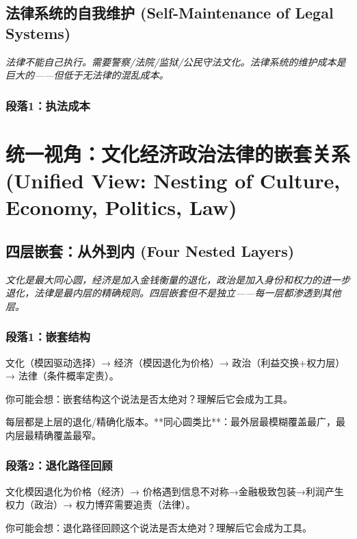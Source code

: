 \documentclass[a4paper,12pt]{book}
\newenvironment{motivation}{\begin{tcolorbox}[colback=gray!10,colframe=gray!60,title=\textit{动机}]\small\itshape}{\end{tcolorbox}}
\begin{document}
\begin{motivation}
\begin{motivation}
	\subsection{法律系统的自我维护 (Self-Maintenance of Legal Systems)}
	\begin{motivation}法律不能自己执行。需要警察/法院/监狱/公民守法文化。法律系统的维护成本是巨大的——但低于无法律的混乱成本。\end{motivation}
	\subsubsection*{段落1：执法成本}


	\section{统一视角：文化经济政治法律的嵌套关系 (Unified View: Nesting of Culture, Economy, Politics, Law)}

	\subsection{四层嵌套：从外到内 (Four Nested Layers)}
	\begin{motivation}
		文化是最大同心圆，经济是加入金钱衡量的退化，政治是加入身份和权力的进一步退化，法律是最内层的精确规则。四层嵌套但不是独立——每一层都渗透到其他层。
	\end{motivation}

	\subsubsection*{段落1：嵌套结构}
	文化（模因驱动选择）→ 经济（模因退化为价格）→ 政治（利益交换+权力层）→ 法律（条件概率定责）。
	\begin{tcolorbox}[colback=yellow!5, title=\textit{读者行为预测}]
		你可能会想：嵌套结构这个说法是否太绝对？理解后它会成为工具。
	\end{tcolorbox}

每层都是上层的退化/精确化版本。**同心圆类比**：最外层最模糊覆盖最广，最内层最精确覆盖最窄。

	\subsubsection*{段落2：退化路径回顾}
	文化模因退化为价格（经济）→ 价格遇到信息不对称→金融极致包装→利润产生权力（政治）→ 权力博弈需要追责（法律）。
	\begin{tcolorbox}[colback=yellow!5, title=\textit{读者行为预测}]
		你可能会想：退化路径回顾这个说法是否太绝对？理解后它会成为工具。
	\end{tcolorbox}


\end{motivation}
\end{motivation}
\end{document}
